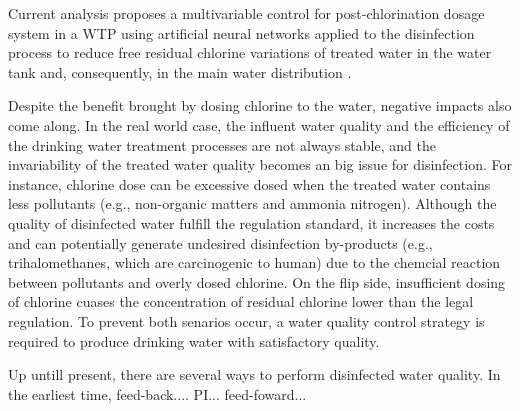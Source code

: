 Current analysis proposes a multivariable control for post-chlorination dosage system in a WTP using artificial neural networks applied to the disinfection process to reduce free residual chlorine variations of treated water in the water tank and, consequently, in the main water distribution \citep{librantzArtificialNeuralNetworks2018}.

Despite the benefit brought by dosing chlorine to the water, negative impacts also come along. In the real world case, the influent water quality and the efficiency of the drinking water treatment processes are not always stable, and the invariability of the treated water quality becomes an big issue for disinfection. For instance, chlorine dose can be excessive dosed when the treated water contains less pollutants (e.g., non-organic matters and ammonia nitrogen). Although the quality of disinfected water fulfill the regulation standard, it increases the costs and can potentially generate undesired disinfection by-products (e.g., trihalomethanes, which are carcinogenic to human) due to the chemcial reaction between pollutants and overly dosed chlorine. On the flip side, insufficient dosing of chlorine cuases the concentration of residual chlorine lower than the legal regulation. To prevent both senarios occur, a water quality control strategy is required to produce drinking water with satisfactory quality. 

Up untill present, there are several ways to perform disinfected water quality. In the earliest time, feed-back.... PI... feed-foward...



